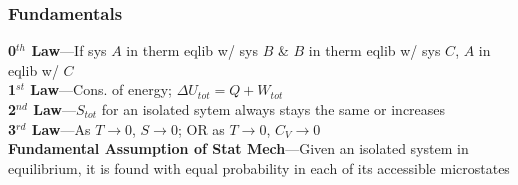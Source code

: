 \documentclass[letterpaper,landscape,10pt]{article}
\begin{document}
{\begin{multicols}{4}
  \subsubsection*{Fundamentals}
    \textbf{0$^{th}$ Law}---If sys $A$ in therm eqlib w/ sys $B$ \& $B$
    	in therm eqlib w/ sys $C$, $A$ in eqlib w/ $C$ \\
    	\textbf{1$^{st}$ Law}---Cons. of energy; $\Delta U_{tot} = Q+W_{tot}$ \\
    \textbf{2$^{nd}$ Law}---$S_{tot}$ for an isolated sytem always stays
    	the same or increases \\
    \textbf{3$^{rd}$ Law}---As $T \rightarrow 0$, $S \rightarrow 0$; OR as
    	$T\rightarrow0$, $C_V\rightarrow0$ \\
    \textbf{Fundamental Assumption of Stat Mech}---Given an isolated system
    	in equilibrium, it is found with equal probability in each of its
    	accessible microstates \\

\end{multicols}}
\end{document}
